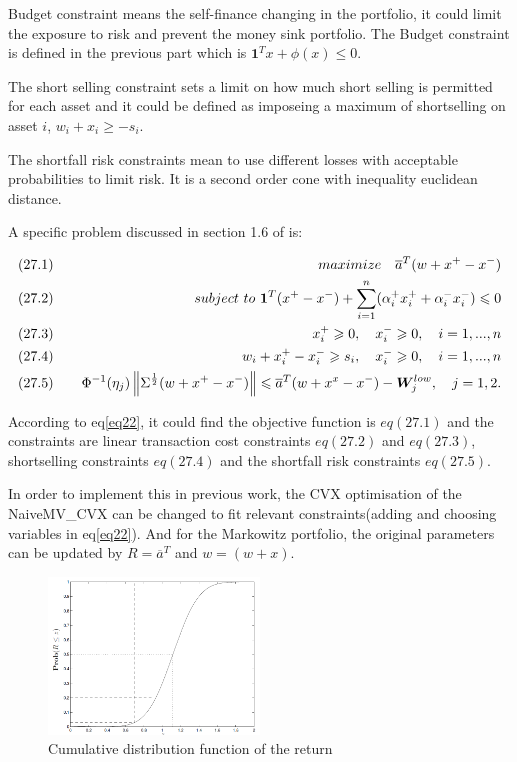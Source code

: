 \documentclass[sigconf]{acmart}
\begin{document}
Budget constraint means the self-finance changing in the portfolio, it could limit the exposure to risk and prevent the money sink portfolio. The Budget constraint is defined in the previous part which is $\bm{1}^{T}x+\phi(x)\leqslant0$.

The short selling constraint sets a limit on how much short selling is permitted for each asset and it could be defined as imposeing a maximum of shortselling on asset $i$, $w_{i}+x_{i}\geqslant -s_{i}$.

The shortfall risk constraints mean to use different losses with acceptable probabilities to limit risk. It is a second order cone with inequality euclidean distance.

A specific problem discussed in section 1.6 of \cite{lobo2007portfolio} is:

\begin{equation} \label{eq22}
\setlength{\abovedisplayskip}{3pt}
\setlength{\belowdisplayskip}{9pt}
\begin{aligned}
&(27.1) \quad &maximize\quad \overline{a}^{T}(w+x^{+}-x^{-}) \\
&(27.2) \quad &subject\ to\ \bm{1}^{T}(x^{+}-x^{-})+\sum_{i=1}^{n}(\alpha_{i}^{+}x_{i}^{+}+\alpha_{i}^{-}x_{i}^{-})\leqslant0 \\
&(27.3) \quad &x_{i}^{+}\geqslant0, \quad x_{i}^{-}\geqslant0, \quad i=1,...,n \\
&(27.4) \quad &w_{i}+x_{i}^{+}-x_{i}^{-}\geqslant s_{i}, \quad x_{i}^{-}\geqslant0, \quad i=1,...,n\\
&(27.5) \quad &\Phi^{-1}(\eta_{j})\left \|\Sigma^{\frac{1}{2}}(w+x^{+}-x^{-})  \right \| \leqslant \overline{a}^{T}(w+x^{x}-x^{-})-\bm{W}_{j}^{low}, \quad j=1,2.
\end{aligned}
\end{equation}

According to eq\eqref{eq22}, it could find the objective function is $eq(27.1)$ and the constraints are linear transaction cost constraints $eq(27.2)$ and $eq(27.3)$, shortselling constraints $eq(27.4)$ and the shortfall risk constraints $eq(27.5)$.

In order to implement this in previous work, the CVX optimisation of the NaiveMV\_CVX can be changed to fit relevant constraints(adding and choosing variables in eq\eqref{eq22}). And for the Markowitz portfolio, the original parameters can be updated by $R=\overline{a}^{T}$ and $w=(w+x)$.

\begin{figure}[htbp]
    \centering
    \includegraphics[width=0.5\textwidth]{12.png}
    \caption{\label{}Cumulative distribution function of the return\cite{lobo2007portfolio}}
\end{figure}
\end{document}
